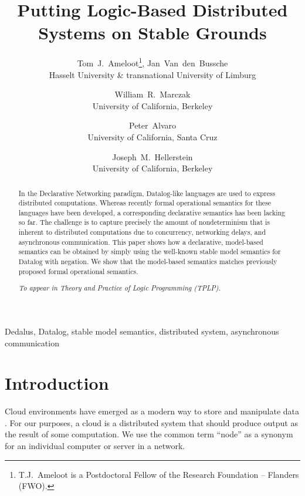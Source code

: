 \documentclass{tlp}
\newcommand{\langname}[1]{\text{#1}}  \newcommand{\pred}[1]{\mathtt{#1}}  \newcommand{\fname}[1]{\mathit{#1}}  \newcommand{\sq}[1]{`{#1}'}
\newcommand{\datalog}{\langname{Datalog}}
\begin{document}
\title{Putting Logic-Based Distributed Systems on Stable Grounds}



\author[Ameloot et al.]
{Tom~J.~Ameloot\thanks{T.J.~Ameloot is a Postdoctoral Fellow of the Research Foundation -- Flanders (FWO).}, Jan~Van~den~Bussche \\
    Hasselt University \& transnational University of Limburg
\and William~R.~Marczak\\
    University of California, Berkeley
\and Peter~Alvaro \\
    University of California, Santa Cruz
\and Joseph~M.~Hellerstein\\
    University of California, Berkeley}


\maketitle

\begin{abstract}
In the Declarative Networking paradigm, $\datalog$-like languages
are used to express distributed computations. Whereas recently formal
operational semantics for these languages have been developed, a corresponding
declarative semantics has been lacking so far. The challenge is to
capture precisely the amount of nondeterminism that is inherent to
distributed computations due to concurrency, networking delays, and
asynchronous communication. This paper shows how a declarative, model-based
semantics can be obtained by simply using the well-known stable model
semantics for $\datalog$ with negation. We show that the model-based
semantics matches previously proposed formal operational
semantics.

\emph{To appear in Theory and Practice of Logic Programming (TPLP).}
\end{abstract}

\begin{keywords}
 Dedalus, Datalog, stable model semantics, distributed system, asynchronous communication
\end{keywords}

\section{Introduction}

Cloud environments have emerged as a modern way to store and manipulate
data \cite{cloud,cavage_2013}. 
For our purposes, a cloud is a distributed
system that should produce output as the result of some computation. We use the common term ``node'' as a synonym for an individual computer or server in a network.
\end{document}
